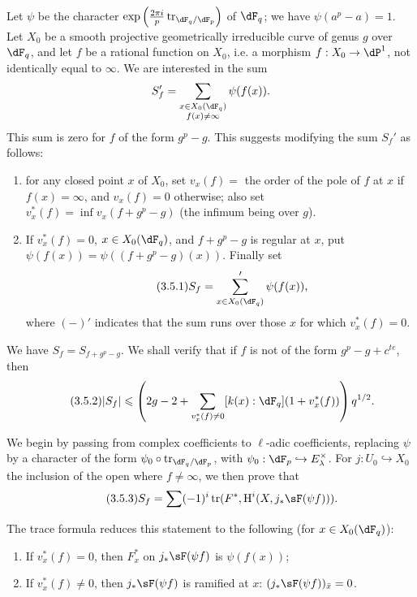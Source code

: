 Let $\psi$ be the character 
$\exp\left(\frac{2\pi i}{p} \tr_{\dF_q/\dF_p}\right)$ of $\dF_q$; we have 
$\psi(a^p-a)=1$. Let $X_0$ be a smooth projective geometrically 
irreducible curve of genus $g$ over $\dF_q$, and let $f$ be a rational function on 
$X_0$, i.e. a morphism $f:X_0 \to \dP^1$, not identically equal to 
$\infty$. We are interested in the sum 
\[
  S_f' = \sum_{\substack{x\in X_0(\dF_q) \\ f(x)\ne \infty}} \psi(f(x)) 
  \text{.}
\]
This sum is zero for $f$ of the form $g^p-g$. This suggests modifying 
the sum $S_f'$ as follows: 
\begin{enumerate}[\indent a)]
  \item for any closed point $x$ of $X_0$, set $v_x(f) = $ the order of the 
    pole of $f$ at $x$ if $f(x)=\infty$, and $v_x(f)=0$ otherwise; also set 
    $v_x^\ast(f) = \inf v_x(f+g^p-g)$ (the infimum being over $g$). 
  \item If $v_x^\ast(f)=0$, $x\in X_0(\dF_q)$, and $f+g^p-g$ is 
    regular at $x$, put $\psi(f(x)) = \psi((f+g^p-g)(x))$. Finally set 
    \begin{equation*}\tag{3.5.1}\label{VI:eq:3-5-1}
      S_f = \sum'_{x\in X_0(\dF_q)} \psi(f(x)) \text{,}
    \end{equation*}
    where $(-)'$ indicates that the sum runs over those $x$ for which 
    $v_x^\ast(f)=0$. 
\end{enumerate}

We have $S_f=S_{f+g^p-g}$. We shall verify that if $f$ is not of the 
form $g^p-g+c^{t e}$, then 
\begin{equation*}\tag{3.5.2}\label{VI:eq:3-5-2}
  |S_f|\leqslant \left(2 g-2+\sum_{v_x^\ast(f)\ne 0} [k(x):\dF_q] (1+v_x^\ast(f))\right) q^{1/2} \text{.}
\end{equation*}

We begin by passing from complex coefficients to $\ell$-adic coefficients, replacing $\psi$ by 
a character of the form $\psi_0\circ \tr_{\dF_q/\dF_p}$, with 
$\psi_0:\dF_p\hookrightarrow E_\lambda^\times$. For $j:U_0\hookrightarrow X_0$ 
the inclusion of the open where $f\ne\infty$, we then prove that 
\begin{equation*}\tag{3.5.3}\label{VI:eq:3-5-3}
  S_f = \sum (-1)^i \tr(F^\ast,\h^i(X,j_\ast \sF(\psi f))) \text{.} 
\end{equation*}

The trace formula reduces this statement to the following (for 
$x\in X_0(\dF_q)$): 
\begin{enumerate}[\indent a)]
  \item If $v_x^\ast(f)=0$, then $F_x^\ast$ on $j_\ast \sF(\psi f)$ is 
    $\psi(f(x))$; 
  \item If $v_x^\ast(f)\ne 0$, then $j_\ast \sF(\psi f)$ is ramified at $x$: 
    $(j_\ast \sF(\psi f))_{\bar x}=0$. 
\end{enumerate}

